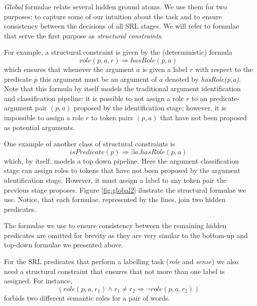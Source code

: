 
\emph{Global} formulae relate several hidden ground atoms. We use them for two purposes: to capture some of our intuition about the task and to ensure consistency between the decisions of all SRL stages. We will refer to formulae that serve the first purpose as \emph{structural constraints}. 

For example, a structural constraint is given by the (deterministic) formula
\[role(p,a,r) \Rightarrow hasRole(p,a)\]
which ensures that whenever the argument $a$ is given a label $r$ with respect to the predicate $p$ this argument must be an argument of $a$ denoted by \emph{hasRole(p,a)}. Note that this formula by itself models the traditional argument identification and classification pipeline: it is possible to not assign a role $r$ to an predicate-argument pair $(p,a)$ proposed by the identification stage; however, it is impossible to assign a role $r$ to token pairs $(p,a)$ that have not been proposed as potential arguments.

One example of another class of structural constraints is 
\[
isPredicate(p)\Rightarrow\exists a.hasRole(p,a)
\]
which, by itself, models a top down pipeline. Here the argument classification stage can assign roles to tokens that have not been proposed by the argument identification stage. However, it must assign a label to any token pair the previous stage proposes. 
Figure \ref{fig:global2} ilustrate the structural formulae we use. Notice, that each formulae, represented by the lines, join two hidden predicates.

The formulae we use to ensure consistency between the remaining hidden predicates are omitted for brevity as they are very similar to the bottom-up and top-down formulae we presented above.

For the SRL predicates that perform a labelling task (\emph{role} and \emph{sense}) we also need a structural constraint that ensures that not more than one label is assigned. For instance,
\[
(role(p,a,r_1) \wedge r_1 \neq r_2 \Rightarrow \neg role(p,a,r_2)  )
\]
forbids two different semantic roles for a pair of words. 


